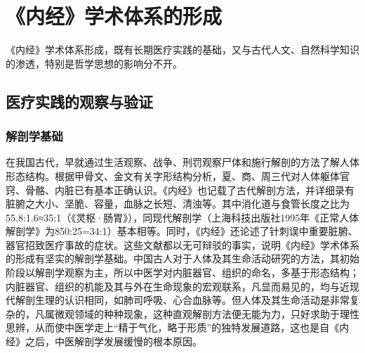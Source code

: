 \documentclass[draft,12pt]{ctexbook}
\begin{document}
{%
	\label{fig:《内经》学术体系基本框架结构图}
	\renewcommand{\baselinestretch}{1}
	\small
	\hspace{.1\textwidth}%
	\hfill
}

\section{《内经》学术体系的形成} %

《内经》学术体系形成，既有长期医疗实践的基础，又与古代人文、自然科学知识的渗透，特别是哲学思想的影响分不开。

\subsection{医疗实践的观察与验证} %

\subsubsection{解剖学基础}%

在我国古代，早就通过生活观察、战争、刑罚观察尸体和施行解剖的方法了解人体形态结构。根据甲骨文、金文有关字形结构分析，夏、商、周三代对人体躯体官窍、骨骼、内脏已有基本正确认识。《内经》也记载了古代解剖方法，并详细录有脏腑之大小、坚脆、容量，血脉之长短、清浊等。其中消化道与食管长度之比为55.8:1.6≈35:1（《灵枢·肠胃》），同现代解剖学（上海科技出版社1995年《正常人体解剖学》为850:25=34:1）基本相等。同时，《内经》还论述了针刺误中重要脏腑、器官招致医疗事故的症状。这些文献都以无可辩驳的事实，说明《内经》学术体系的形成有坚实的解剖学基础。中国古人对于人体及其生命活动研究的方法，其初始阶段以解剖学观察为主，所以中医学对内脏器官、组织的命名，多基于形态结构；内脏器官、组织的机能及其与外在生命现象的宏观联系，凡显而易见的，均与近现代解剖生理的认识相同，如肺司呼吸、心合血脉等。但人体及其生命活动是非常复杂的，凡属微观领域的种种现象，这种直观解剖方法便无能为力，只好求助于理性思辨，从而使中医学走上“精于气化，略于形质”的独特发展道路，这也是自《内经》之后，中医解剖学发展缓慢的根本原因。
\end{document}

